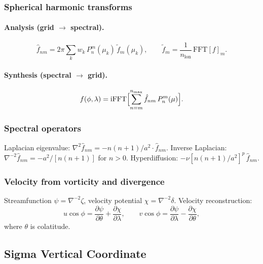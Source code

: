 \documentclass[11pt,a4paper]{article}
\newcommand{\pp}{\partial}
\begin{document}
\subsubsection{Spherical harmonic transforms}
\paragraph{Analysis (grid $\to$ spectral).}
\begin{equation}
  \hat f_{nm} = 2\pi\sum_k w_k\,P_n^m(\mu_k)\,\tilde f_m(\mu_k),
  \qquad \tilde f_m = \frac{1}{n_{\mathrm{lon}}}\,\mathrm{FFT}[f]_m.
\end{equation}

\paragraph{Synthesis (spectral $\to$ grid).}
\begin{equation}
  f(\phi,\lambda) = \mathrm{iFFT}\Bigl[\sum_{n=m}^{n_{\max}}\hat f_{nm}\,P_n^m(\mu)\Bigr].
\end{equation}

\subsubsection{Spectral operators}
Laplacian eigenvalue: $\nabla^2\hat f_{nm}=-n(n+1)/a^2\cdot\hat f_{nm}$.  Inverse Laplacian: $\nabla^{-2}\hat f_{nm}=-a^2/[n(n+1)]$ for $n>0$.  Hyperdiffusion: $-\nu[n(n+1)/a^2]^p\,\hat f_{nm}$.

\subsubsection{Velocity from vorticity and divergence}
Streamfunction $\psi=\nabla^{-2}\zeta$, velocity potential $\chi=\nabla^{-2}\delta$.  Velocity reconstruction:
\begin{equation}
  u\cos\phi = \frac{\pp\psi}{\pp\theta}+\frac{\pp\chi}{\pp\lambda},
  \qquad
  v\cos\phi = \frac{\pp\psi}{\pp\lambda}-\frac{\pp\chi}{\pp\theta},
\end{equation}
where $\theta$ is colatitude.

\subsection{Sigma Vertical Coordinate}
\end{document}
